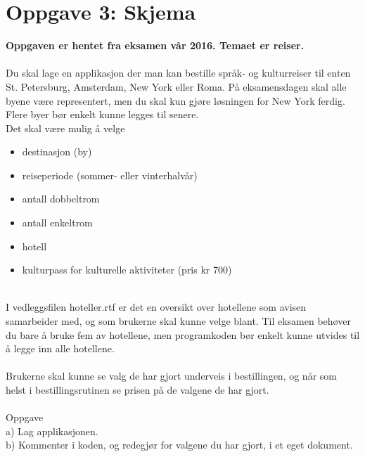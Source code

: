 \documentclass[a4paper, norsk, 10pt]{article}
\begin{document}
\section*{Oppgave 3: Skjema}
\textbf{Oppgaven er hentet fra eksamen vår 2016. Temaet er reiser.} \\
\ \\
Du skal lage en applikasjon der man kan bestille språk- og kulturreiser til enten St. Petersburg, Amsterdam, New York eller Roma. På eksamensdagen skal alle byene være representert, men du skal kun gjøre løsningen for New York ferdig. Flere byer bør enkelt kunne legges til senere.\\
Det skal være mulig å velge\\
\begin{itemize} 
\item destinasjon (by)
\item reiseperiode (sommer- eller vinterhalvår)
\item antall dobbeltrom
\item antall enkeltrom
\item hotell
\item kulturpass for kulturelle aktiviteter (pris kr 700)
\end{itemize} 
\ \\
I vedleggsfilen hoteller.rtf er det en oversikt over hotellene som avisen samarbeider med, og som brukerne skal kunne velge blant. Til eksamen behøver du bare å bruke fem av hotellene, men programkoden bør enkelt kunne utvides til å legge inn alle hotellene.\\
\ \\
Brukerne skal kunne se valg de har gjort underveis i bestillingen, og når som helst i bestillingsrutinen se prisen på de valgene de har gjort.\\
\ \\
Oppgave \\
a) Lag applikasjonen.\\
b) Kommenter i koden, og redegjør for valgene du har gjort, i et eget dokument.\\
\end{document}
